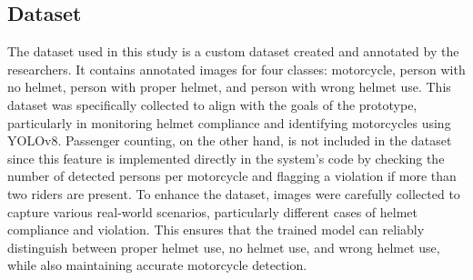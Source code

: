 \begin{refsection}
\subsection*{Dataset}


The dataset used in this study is a custom dataset created and annotated by the researchers. It contains annotated images for four classes: motorcycle, person with no helmet, person with proper helmet, and person with wrong helmet use. This dataset was specifically collected to align with the goals of the prototype, particularly in monitoring helmet compliance and identifying motorcycles using YOLOv8. Passenger counting, on the other hand, is not included in the dataset since this feature is implemented directly in the system’s code by checking the number of detected persons per motorcycle and flagging a violation if more than two riders are present. To enhance the dataset, images were carefully collected to capture various real-world scenarios, particularly different cases of helmet compliance and violation. This ensures that the trained model can reliably distinguish between proper helmet use, no helmet use, and wrong helmet use, while also maintaining accurate motorcycle detection.


\end{refsection}
